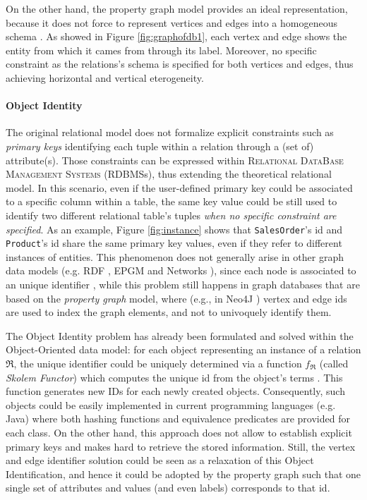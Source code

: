 On the other hand, the property graph model provides an ideal representation, because it does not force to represent vertices and edges into a homogeneous schema \cite{Vasilyeva13}. As showed in Figure \ref{fig:graphofdb1}, each vertex and edge shows the entity from which it cames from through its label. Moreover, no specific constraint as the relations's schema is specified for both vertices and edges, thus achieving horizontal and vertical eterogeneity.

\paragraph*{Object Identity}\label{sec:objid}
The original relational model does not formalize explicit constraints such as \textit{primary keys} identifying each tuple within a relation through a (set of) attribute(s). Those constraints can be expressed within \textsc{Relational DataBase Management Systems} (RDBMSs), thus extending the theoretical relational model. In this scenario, even if the user-defined primary key could be associated to a specific column within a table, the same key value could be still used to identify two different relational table's tuples \textit{when no specific constraint are specified}. As an example, Figure \ref{fig:instance} shows that \texttt{SalesOrder}'s id and \texttt{Product}'s id share the same primary key values, even if they refer to different instances of entities. This phenomenon does not generally arise in other graph data models (e.g. RDF \cite{Allemang2011}, EPGM \cite{apacheflink}%
and Networks \cite{Johnson2011}), since each node is associated to an unique identifier \cite{GutierrezInclusion}, while this problem still
happens in graph databases that are based on the \textit{property graph} model, where (e.g., in Neo4J \cite{Neo4jAlg}) vertex and edge ids are used to index the graph elements, and not to univoquely identify them. 

The Object Identity problem has already been formulated and solved within the Object-Oriented data model: for each object
representing an instance of a relation $\Re$, the unique identifier could be uniquely determined via a function $f_\Re$ 
(called \textit{Skolem Functor}\label{skolem}) which computes the unique id from the object's terms \cite{Cabibbo}. This function
generates new IDs for each newly created objects. Consequently, such objects could be easily implemented
in current programming languages (e.g. Java) where both hashing functions and equivalence predicates are provided for
each class. On the other hand, this approach does not allow to establish explicit primary keys and makes hard to retrieve the stored information. Still, the vertex and edge identifier solution could be seen as a relaxation of this Object Identification, and hence it could be adopted by the property graph such that one single set of attributes and values (and even labels) corresponds to that id.

